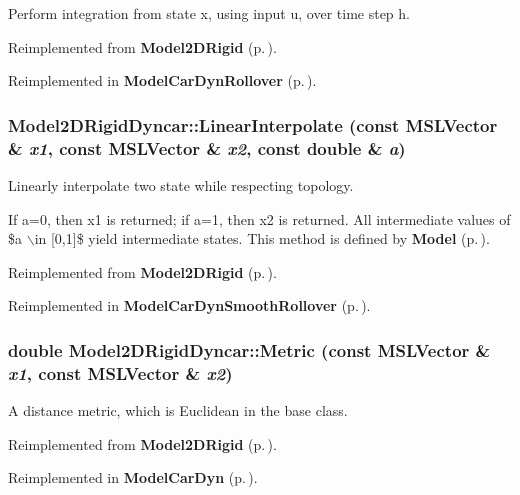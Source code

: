 Perform integration from state x, using input u, over time step h.



Reimplemented from {\bf Model2DRigid} {\rm (p.\,\pageref{classModel2DRigid_a2})}.

Reimplemented in {\bf Model\-Car\-Dyn\-Rollover} {\rm (p.\,\pageref{classModelCarDynRollover_a5})}.
\subsubsection{ Model2DRigid\-Dyncar::Linear\-Interpolate (const {\bf MSLVector} \& {\em x1}, const {\bf MSLVector} \& {\em x2}, const double \& {\em a})\hspace{0.3cm}{\tt  [virtual]}}\label{classModel2DRigidDyncar_a6}


Linearly interpolate two state while respecting topology.

If a=0, then x1 is returned; if a=1, then x2 is returned. All intermediate values of \$a $\backslash$in [0,1]\$ yield intermediate states. This method is defined by {\bf Model} {\rm (p.\,\pageref{classModel})}. 

Reimplemented from {\bf Model2DRigid} {\rm (p.\,\pageref{classModel2DRigid_a4})}.

Reimplemented in {\bf Model\-Car\-Dyn\-Smooth\-Rollover} {\rm (p.\,\pageref{classModelCarDynSmoothRollover_a5})}.
\subsubsection{\setlength{\rightskip}{0pt plus 5cm}double Model2DRigid\-Dyncar::Metric (const {\bf MSLVector} \& {\em x1}, const {\bf MSLVector} \& {\em x2})\hspace{0.3cm}{\tt  [virtual]}}\label{classModel2DRigidDyncar_a5}


A distance metric, which is Euclidean in the base class.



Reimplemented from {\bf Model2DRigid} {\rm (p.\,\pageref{classModel2DRigid_a6})}.

Reimplemented in {\bf Model\-Car\-Dyn} {\rm (p.\,\pageref{classModelCarDyn_a3})}.
